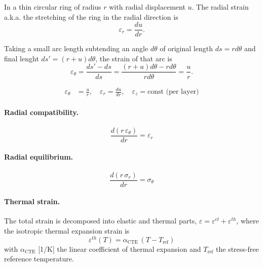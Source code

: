 \begin{refsection}
In a thin circular ring of radius $r$ with radial displacement $u$. The radial strain a.k.a. the stretching of the ring in the radial direction is
\begin{equation}
  \varepsilon_r = \frac{du}{dr}.
\end{equation}

Taking a small arc length subtending an angle $d \theta$ of original length $ds = r d\theta$ and final lenght $ds' = (r + u) d \theta$, the strain of that arc is
\begin{equation}
  \varepsilon_\theta = \frac{ds' - ds}{ds} = \frac{(r + u)d \theta - r d\theta}{r d \theta} = \frac{u}{r}. 
\end{equation}

\begin{align}
  \varepsilon_\theta &= \frac{u}{r}, \quad
  \varepsilon_r = \frac{du}{dr}, \quad
  \varepsilon_z = \text{const (per layer)}
  \label{eq:strain_disp}
\end{align}

\paragraph{Radial compatibility.}
\begin{equation}
  \frac{d(r\,\varepsilon_\theta)}{dr} = \varepsilon_r
  \label{eq:compat_cont}
\end{equation}

\paragraph{Radial equilibrium.}
\begin{equation}
  \frac{d(r\,\sigma_r)}{dr} = \sigma_\theta
  \label{eq:equil_cont}
\end{equation}

\paragraph{Thermal strain.} The total strain is decomposed into elastic and thermal parts, $\varepsilon = \varepsilon^{el} + \varepsilon^{th}$, where the isotropic thermal expansion strain is
\begin{equation}
  \varepsilon^{th}(T) = \alpha_{\mathrm{CTE}}\,(T - T_{\mathrm{ref}})
  \label{eq:thermal_strain}
\end{equation}
with $\alpha_{\mathrm{CTE}}$ [1/K] the linear coefficient of thermal expansion and $T_{\mathrm{ref}}$ the stress-free reference temperature.


\end{refsection}
